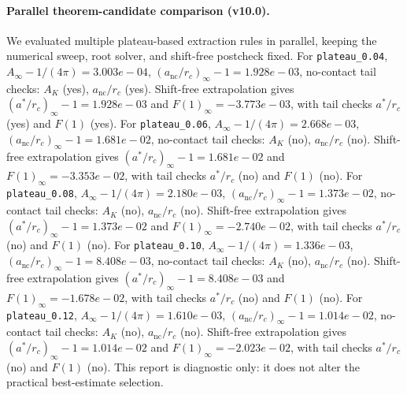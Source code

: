 \paragraph{Parallel theorem-candidate comparison (v10.0).}
We evaluated multiple plateau-based extraction rules in parallel, keeping the numerical sweep, root solver, and shift-free postcheck fixed. For \texttt{plateau_0.04}, $A_\infty-1/(4\pi)=3.003e-04$, $(a_{\mathrm{nc}}/r_c)_\infty-1=1.928e-03$, no-contact tail checks: $A_K$ (yes), $a_{\mathrm{nc}}/r_c$ (yes). Shift-free extrapolation gives $(a^*/r_c)_\infty-1=1.928e-03$ and $F(1)_\infty=-3.773e-03$, with tail checks $a^*/r_c$ (yes) and $F(1)$ (yes). For \texttt{plateau_0.06}, $A_\infty-1/(4\pi)=2.668e-03$, $(a_{\mathrm{nc}}/r_c)_\infty-1=1.681e-02$, no-contact tail checks: $A_K$ (no), $a_{\mathrm{nc}}/r_c$ (no). Shift-free extrapolation gives $(a^*/r_c)_\infty-1=1.681e-02$ and $F(1)_\infty=-3.353e-02$, with tail checks $a^*/r_c$ (no) and $F(1)$ (no). For \texttt{plateau_0.08}, $A_\infty-1/(4\pi)=2.180e-03$, $(a_{\mathrm{nc}}/r_c)_\infty-1=1.373e-02$, no-contact tail checks: $A_K$ (no), $a_{\mathrm{nc}}/r_c$ (no). Shift-free extrapolation gives $(a^*/r_c)_\infty-1=1.373e-02$ and $F(1)_\infty=-2.740e-02$, with tail checks $a^*/r_c$ (no) and $F(1)$ (no). For \texttt{plateau_0.10}, $A_\infty-1/(4\pi)=1.336e-03$, $(a_{\mathrm{nc}}/r_c)_\infty-1=8.408e-03$, no-contact tail checks: $A_K$ (no), $a_{\mathrm{nc}}/r_c$ (no). Shift-free extrapolation gives $(a^*/r_c)_\infty-1=8.408e-03$ and $F(1)_\infty=-1.678e-02$, with tail checks $a^*/r_c$ (no) and $F(1)$ (no). For \texttt{plateau_0.12}, $A_\infty-1/(4\pi)=1.610e-03$, $(a_{\mathrm{nc}}/r_c)_\infty-1=1.014e-02$, no-contact tail checks: $A_K$ (no), $a_{\mathrm{nc}}/r_c$ (no). Shift-free extrapolation gives $(a^*/r_c)_\infty-1=1.014e-02$ and $F(1)_\infty=-2.023e-02$, with tail checks $a^*/r_c$ (no) and $F(1)$ (no). This report is diagnostic only: it does not alter the practical best-estimate selection.
